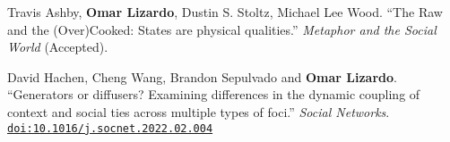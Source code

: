 

\ind Travis Ashby, {\bf Omar Lizardo}, Dustin S. Stoltz, Michael Lee Wood. ``The Raw and the (Over)Cooked: States are physical qualities.'' {\em Metaphor and the Social World} (Accepted). 

\ind David Hachen, Cheng Wang, Brandon Sepulvado and {\bf Omar Lizardo}. ``Generators or diffusers? Examining differences in the dynamic coupling of context and social ties across multiple types of foci.'' {\em Social Networks}. \href{https://doi.org/10.1016/j.socnet.2022.02.004}{\nolinkurl{doi:10.1016/j.socnet.2022.02.004}}

